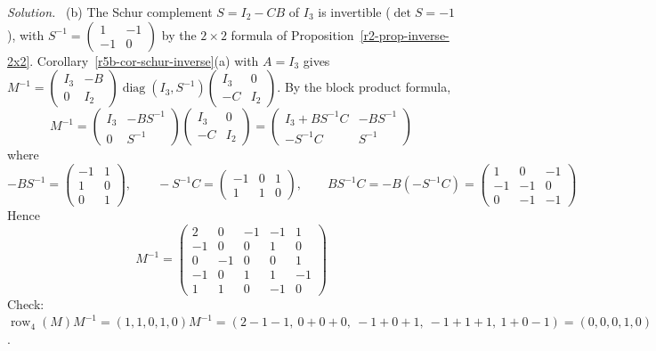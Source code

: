 \documentclass[12pt]{article}
\DeclareMathOperator{\row}{row}
\DeclareMathOperator{\diag}{diag}
\theoremstyle{definition}
\newenvironment{solution}{\par\noindent\textit{Solution.}\ }{\par\smallskip}
\begin{document}
\begin{solution}
(b) The Schur complement \(S=I_2-CB\) of \(I_3\) is invertible (\(\det S=-1\)), with
\(S^{-1}=\left(\begin{smallmatrix}1&-1\\-1&0\end{smallmatrix}\right)\) by the \(2\times2\) formula of
Proposition~\ref{r2-prop-inverse-2x2}. Corollary~\ref{r5b-cor-schur-inverse}(a) with \(A=I_3\) gives
\(M^{-1}=\left(\begin{smallmatrix}I_3&-B\\0&I_2\end{smallmatrix}\right)
\diag(I_3,S^{-1})\left(\begin{smallmatrix}I_3&0\\-C&I_2\end{smallmatrix}\right)\).
By the block product formula,
\[
M^{-1}=\begin{pmatrix}I_3&-BS^{-1}\\0&S^{-1}\end{pmatrix}\begin{pmatrix}I_3&0\\-C&I_2\end{pmatrix}
=\begin{pmatrix}I_3+BS^{-1}C&-BS^{-1}\\-S^{-1}C&S^{-1}\end{pmatrix}
\]
where
\[
-BS^{-1}=\begin{pmatrix}-1&1\\1&0\\0&1\end{pmatrix},\qquad
-S^{-1}C=\begin{pmatrix}-1&0&1\\1&1&0\end{pmatrix},\qquad
BS^{-1}C=-B(-S^{-1}C)=\begin{pmatrix}1&0&-1\\-1&-1&0\\0&-1&-1\end{pmatrix}
\]
Hence
\[
M^{-1}=\left(\begin{array}{ccc|cc}2&0&-1&-1&1\\-1&0&0&1&0\\0&-1&0&0&1\\\hline-1&0&1&1&-1\\1&1&0&-1&0\end{array}\right)
\]
Check: \(\row_4(M)M^{-1}=(1,1,0,1,0)M^{-1}=(2-1-1,\ 0+0+0,\ -1+0+1,\ -1+1+1,\ 1+0-1)=(0,0,0,1,0)\).
\end{solution}
\end{document}
